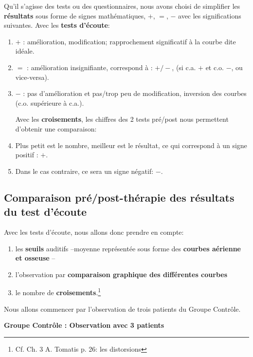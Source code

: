 Qu'il s'agisse des tests ou des questionnaires, nous avons choisi de
simplifier les \textbf{résultats} sous forme de signes
mathématiques, $+$, $=$, $-$ avec les significations suivantes.
Avec les \textbf{tests d'écoute}:
\begin{enumerate}
\item$+$   : amélioration, modification;  rapprochement significatif à la courbe dite idéale.
\item$=$   : amélioration insignifiante, correspond à : $+/-$, (si c.a. $ + $ et c.o. $-$, ou vice-versa).

\item$-$   : pas d'amélioration et pas/trop peu  de modification, inversion
des courbes (c.o. supérieure à c.a.).

  Avec les \textbf{croisements}, les chiffres des 2 tests pré/post
  nous permettent d'obtenir une comparaison:
  \item Plus petit est le nombre, meilleur est le résultat, ce qui correspond à un signe positif : $+$.
\item Dans le
  cas contraire, ce sera un signe négatif: $-$.

\end{enumerate}


 \subsection{ Comparaison pré/post-thérapie des résultats du test d'écoute}
Avec les tests d'écoute, nous
allons donc prendre en compte:

\begin{enumerate}
 \item   les \textbf{seuils} auditifs --moyenne
représentée sous forme des \textbf{courbes aérienne et osseuse} --
\item  l'observation par \textbf{comparaison graphique des différentes
  courbes}
\item le nombre de
\textbf{croisements}.\footnote{Cf. Ch. 3 A. Tomatis p. 26: les distorsions}

\end{enumerate}




  Nous allons commencer par l'observation de trois patients du Groupe Contrôle.


      \textbf{Groupe Contrôle : Observation avec 3 patients}
